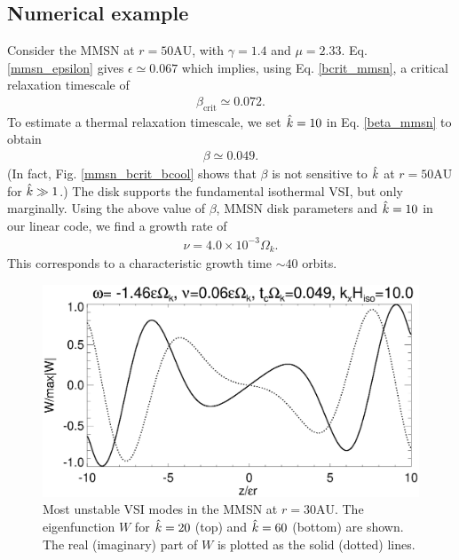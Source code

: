 \subsection{Numerical example}
Consider  the MMSN at $r=50\mathrm{AU}$, with $\gamma=1.4$ and
$\mu=2.33$. Eq. \ref{mmsn_epsilon} gives $\epsilon \simeq
0.067$ which implies, using Eq. \ref{bcrit_mmsn}, a critical 
relaxation timescale of  
\begin{align*}
  \beta_\mathrm{crit} \simeq 0.072. 
\end{align*} 
To estimate a thermal relaxation timescale, we set $\hat{k}=10$ 
in Eq. \ref{beta_mmsn} to obtain 
\begin{align*}
  \beta \simeq 0.049.
\end{align*}
(In fact, Fig. \ref{mmsn_bcrit_bcool} shows that $\beta$  is not
sensitive to $\hat{k}$ at $r=50\mathrm{AU}$ for $\hat{k}\gg1$.)
The disk supports the fundamental isothermal VSI, but only
marginally. Using the above value of $\beta$, MMSN disk parameters and
$\hat{k}=10$ in our linear code, we find a 
growth rate of 
\begin{align*}
  \nu = 4.0\times10^{-3}\Omega_k.
\end{align*}
This corresponds to a characteristic growth time $\sim 40$
orbits. 



\begin{figure}
  \includegraphics[width=\linewidth,clip=true,trim=0cm 1.75cm 0cm 0cm]{figures/eigenvectorW_mmsnkx10.ps}
  \caption{Most unstable VSI modes in the MMSN at
    $r=30\mathrm{AU}$. The eigenfunction $W$ for $\hat{k}=20$ (top) and
    $\hat{k}=60$ (bottom) are shown. The real (imaginary) part of $W$
    is plotted as the solid (dotted) lines.\label{mmsn_eigenW}}  
\end{figure}

